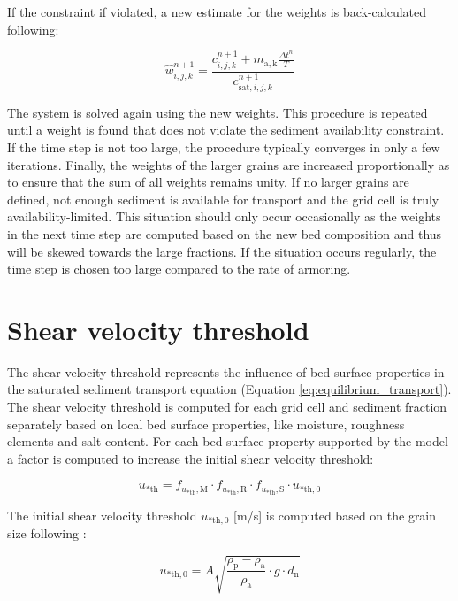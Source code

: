 \noindent If the constraint if violated, a new estimate for the weights
is back-calculated following:

\begin{equation}
  \hat{w}^{n+1}_{i,j,k} = \frac{ c^{n+1}_{i,j,k} + m_{\mathrm{a,k}} \frac{\Delta t^n}{T} }{c^{n+1}_{\mathrm{sat},i,j,k}}
\end{equation}

\noindent The system is solved again using the new weights. This
procedure is repeated until a weight is found that does not violate
the sediment availability constraint. If the time step is not too
large, the procedure typically converges in only a few
iterations. Finally, the weights of the larger grains are increased
proportionally as to ensure that the sum of all weights remains
unity. If no larger grains are defined, not enough sediment is
available for transport and the grid cell is truly
availability-limited. This situation should only occur occasionally as
the weights in the next time step are computed based on the new bed
composition and thus will be skewed towards the large fractions. If
the situation occurs regularly, the time step is chosen too large
compared to the rate of armoring.

\section{Shear velocity threshold}

The shear velocity threshold represents the influence of bed surface
properties in the saturated sediment transport equation (Equation
\ref{eq:equilibrium_transport}). The shear velocity threshold is
computed for each grid cell and sediment fraction separately based on
local bed surface properties, like moisture, roughness elements and
salt content. For each bed surface property supported by the model a
factor is computed to increase the initial shear velocity
threshold:

\begin{equation}
  \label{eq:apx_shearvelocity}
  u_{\mathrm{* th}} = 
  f_{u_{\mathrm{* th}}, \mathrm{M}} \cdot 
  f_{u_{\mathrm{* th}}, \mathrm{R}} \cdot 
  f_{u_{\mathrm{* th}}, \mathrm{S}} \cdot 
  u_{\mathrm{* th, 0}}
\end{equation}

The initial shear velocity threshold $u_{\mathrm{* th, 0}}$ [m/s] is
computed based on the grain size following \citet{Bagnold1937b}:

\begin{equation}
  u_{\mathrm{* th, 0}} = A \sqrt{ \frac{\rho_{\mathrm{p}} - \rho_{\mathrm{a}}}{\rho_{\mathrm{a}}} \cdot g \cdot d_{\mathrm{n}}}
\end{equation}


